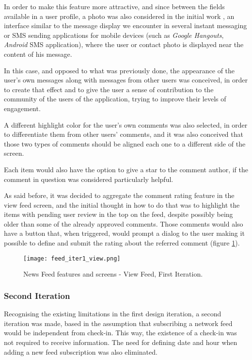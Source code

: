 In order to make this feature more attractive, and since between the fields available in a user profile, a photo was also considered in the initial work \cite{kn:Gon12}, an interface similar to the message display we encounter in several instant messaging or SMS sending applications for mobile devices (such as \emph{Google Hangouts}, \emph{Android} SMS application), where the user or contact photo is displayed near the content of his message.

In this case, and opposed to what was previously done, the appearance of the user's own messages along with messages from other users was conceived, in order to create that effect and to give the user a sense of contribution to the community of the users of the application, trying to improve their levels of engagement.

A different highlight color for the user's own comments was also selected, in order to differentiate them from other users' comments, and it was also conceived that those two types of comments should be aligned each one to a different side of the screen.

Each item would also have the option to give a star to the comment author, if the comment in question was considered particularly helpful. 


As said before, it was decided to aggregate the comment rating feature in the view feed screen, and the initial thought in how to do that was to highlight the items with pending user review in the top on the feed, despite possibly being older than some of the already approved comments. Those comments would also have a button that, when triggered, would prompt a dialog to the user making it possible to define and submit the rating about the referred comment (figure \ref{fig:feed_iter1_view}).

\begin{figure}[htb]
  \begin{center}
    \leavevmode
    \texttt{[image: feed\_iter1\_view.png]}
    \caption{News Feed features and screens - View Feed, First Iteration.}
    \label{fig:feed_iter1_view}
  \end{center}
\end{figure}




\subsubsection{Second Iteration}

Recognising the existing limitations in the first design iteration,  a second iteration was made, based in the assumption that subscribing a network feed would be independent from check-in. This way, the existence of a check-in was not required to receive information. The need for defining date and hour when adding a new feed subscription was also eliminated.

